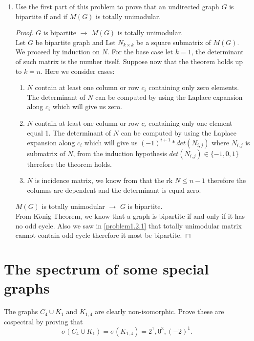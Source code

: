 \documentclass[a4paper, 11pt, oneside]{article}
\newenvironment{problem}[1]
  {\renewcommand\theinnercustomprob{#1}\innercustomprob}
  {\endinnercustomprob}
\begin{document}
\begin{problem}{1.2}
\begin{enumerate}[label=1.2.\arabic*]
\item Use the first part of this problem to prove that an undirected graph $G$ is bipartite if and if $M(G)$ is totally unimodular.
\begin{proof}
$G$ is bipartite $\rightarrow$ $M(G)$ is totally unimodular.\\ 
Let $G$ be bipartite graph and Let $N_{k\times k}$ be a square submatrix of $M(G)$. We proceed by induction on $N$. For the base case let $k = 1$, the determinant of such matrix is the number itself. Suppose now that the theorem holds up to $k=n$. Here we consider cases:
\begin{enumerate}[label=(\alph*)]
\item $N$ contain at least one column or row $c_i$ containing only zero elements. The determinant of $N$ can be computed by using the Laplace expansion along $c_i$ which will give us zero.
\item $N$ contain at least one column or row $c_i$ containing only one element equal 1. The determinant of $N$ can be computed by using the Laplace expansion along $c_i$ which will give us $(-1)^{i+ 1} * det(N_{i,j})$ where $N_{i,j}$ is submatrix of $N$, from the induction hypothesis $det(N_{i,j}) \in\{-1, 0, 1\}$ therefore the theorem holds.
\item $N$ is incidence matrix, we know from \cite[Theorem 10]{konig_egervary}  that the rk $N \leq n - 1$ therefore the columns are dependent and the determinant is equal zero.
\end{enumerate}
$M(G)$ is totally unimodular $\rightarrow$ $G$ is bipartite.\\ 
From K$\ddot{o}$nig Theorem, we know that a graph is bipartite if and only if it has no odd cycle. Also we saw in \ref{problem1.2.1} that  totally unimodular matrix cannot contain odd cycle therefore it most be bipartite.
\end{proof}
\end{enumerate}
\end{problem}

\section{The spectrum of some special graphs}

\begin{problem}{2.1}\label{problem2.1}
The graphs $C_4\cup K_1$ and $K_{1,4}$ are clearly non-isomorphic. Prove these are cospectral by proving that 
\begin{equation*}
\sigma(C_4\cup K_1) = \sigma(K_{1,4}) = 2^1, 0^3, (-2)^1.
\end{equation*}
\end{problem}
\end{document}
